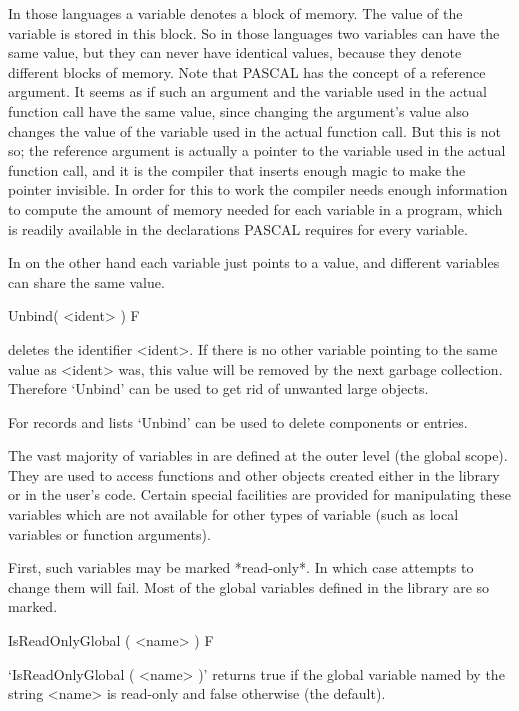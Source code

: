 {In those languages a variable denotes a block of memory. The
value of the variable is stored in this block. So in those languages two
variables can have the same value, but they can never have identical
values, because they denote different blocks of memory.  Note that
PASCAL has the concept of a reference argument. It seems as if such an
argument and the variable used in the actual function call have the same
value, since changing the argument's value also changes the value of the
variable used in the actual function call.  But this is not so; the
reference argument is actually a pointer to the variable used in the
actual function call, and it is the compiler that inserts enough magic to
make the pointer invisible.  In order for this to work the compiler
needs enough information to compute the amount of memory needed for each
variable in a program, which is readily available in the declarations
PASCAL requires for every variable.

In {\GAP} on the other hand each variable just points to a value,
and different variables can share the same value.

\>Unbind( <ident> ) F

deletes the identifier <ident>. If there is no other variable pointing to
the same value as <ident> was, this value will be removed by the next
garbage collection. Therefore `Unbind' can be used to get rid of unwanted
large objects.

For records and lists `Unbind' can be used to delete components or entries.


The vast majority of variables in {\GAP} are defined at the outer
level (the global scope). They are used to access functions and
other objects created either in the {\GAP} library or in the user's
code. Certain special facilities are provided for manipulating these
variables which are not available for other types of variable (such as 
local variables or function arguments).

First, such variables may be marked *read-only*. In which case
attempts to change them will fail. Most of the global variables
defined in the {\GAP} library are so marked.

\>IsReadOnlyGlobal ( <name> ) F

`IsReadOnlyGlobal ( <name> )' returns true if the global variable
named by the string <name> is read-only and false otherwise (the
default). 

}
